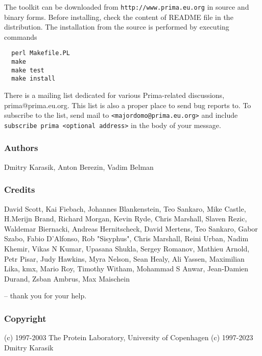 \documentclass{report}
\begin{document}
The toolkit can be downloaded from \texttt{http://www.prima.eu.org} in
source and binary forms. Before installing, check the content of README file
in the distribution. The installation from the source is performed by
executing commands
\begin{verbatim}
  perl Makefile.PL
  make
  make test
  make install
\end{verbatim}

There is a mailing list dedicated for various Prima-related discussions,
prima@prima.eu.org. This list is also a proper place to send bug reports to.
To subscribe to the list, send mail to \texttt{<majordomo@prima.eu.org>} and
include \texttt{subscribe prima <optional address>} in the body of your message.

\subsubsection{Authors}

Dmitry Karasik,
Anton Berezin,
Vadim Belman

\subsubsection{Credits}

David Scott,
Kai Fiebach,
Johannes Blankenstein,
Teo Sankaro,
Mike Castle,
H.Merijn Brand,
Richard Morgan,
Kevin Ryde,
Chris Marshall,
Slaven Rezic,
Waldemar Biernacki,
Andreas Hernitscheck,
David Mertens,
Teo Sankaro,
Gabor Szabo,
Fabio D'Alfonso,
Rob "Sisyphus",
Chris Marshall,
Reini Urban,
Nadim Khemir,
Vikas N Kumar,
Upasana Shukla,
Sergey Romanov,
Mathieu Arnold,
Petr Pisar,
Judy Hawkins,
Myra Nelson,
Sean Healy,
Ali Yassen,
Maximilian Lika,
kmx,
Mario Roy,
Timothy Witham,
Mohammad S Anwar,
Jean-Damien Durand,
Zsban Ambrus,
Max Maischein

-- thank you for your help.

\subsubsection{Copyright}

(c) 1997-2003 The Protein Laboratory, University of Copenhagen
(c) 1997-2023 Dmitry Karasik
\end{document}
